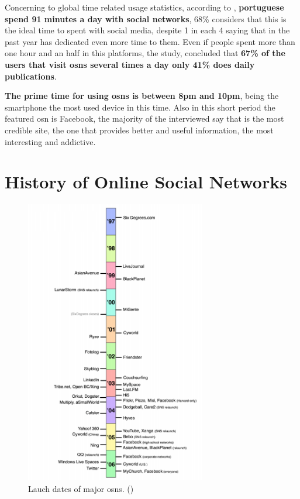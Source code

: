 \indent Concerning to global time related usage statistics, according to \cite{marktest2016}, \textbf{portuguese spend 91 minutes a day with social networks},
68\% considers that this is the ideal time to spent with social media, despite 1 in each 4 saying that in the past year has dedicated even more time to them.
Even if people spent more than one hour and an half in this platforms, the study,
 concluded that \textbf{67\% of the users that visit \glspl{osn} several times a day only 41\% does daily publications}.

\indent \textbf{The prime time for using \glspl{osn} is between 8pm and 10pm}, being the smartphone the most used device in this time. Also in this short period the
featured \gls{osn} is Facebook, the majority of the interviewed say that is the most credible site, the one that provides better and useful information,
the most interesting and addictive.


\section{History of Online Social Networks}
\begin{figure}[h!]
\begin{center}
  \includegraphics[width=0.7\textwidth]{img/timeline.png}
\end{center}
\caption{\label{img:timeline} Lauch dates of major \glspl{osn}. (\cite{ellison2007social})}
\end{figure}

